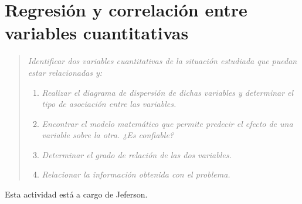 \section*{Regresión y correlación entre variables cuantitativas}
\begin{quotation}
    \emph{\textcolor{gray}{Identificar dos variables cuantitativas de la situación estudiada que puedan estar relacionadas y:}}
    \begin{enumerate}
        \item  \emph{\textcolor{gray}{Realizar el diagrama de dispersión de dichas variables y determinar el tipo de asociación entre las variables.}}
        \item  \emph{\textcolor{gray}{Encontrar el modelo matemático que permite predecir el efecto de una variable sobre la otra. ¿Es confiable?}}
        \item  \emph{\textcolor{gray}{Determinar el grado de relación de las dos variables.}}
        \item  \emph{\textcolor{gray}{Relacionar la información obtenida con el problema.}}
    \end{enumerate}
\end{quotation}
Esta actividad está a cargo de Jeferson.